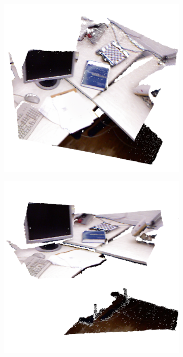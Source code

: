 \begin{figure}[H]
\begin{center}
\begin{subfigure}[b]{0.3\textwidth}
\includegraphics[scale=0.25]{images/3d_point_cloud1.png}
\caption{}
\end{subfigure}
\begin{subfigure}[b]{0.3\textwidth}
\includegraphics[scale=0.25]{images/3d_point_cloud2.png}
\caption{}
\end{subfigure}
\begin{subfigure}[b]{0.3\textwidth}

\end{subfigure}
\end{center}
\end{figure}
